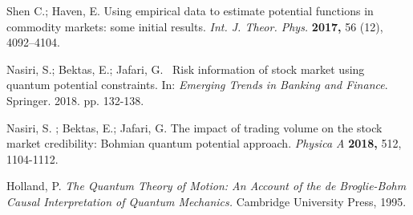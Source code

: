 \documentclass[journal,article,submit,moreauthors,pdftex]{Definitions/mdpi}
\begin{document}
\begin{thebibliography}{99}
	 Shen C.; Haven, E. Using empirical data to estimate potential
	functions in commodity markets: some initial results. \textit{Int. J. Theor.
		Phys. } \textbf{2017, }56 (12), 4092--4104.
	
	 Nasiri, S.; Bektas, E.; Jafari, G. \ Risk information of
	stock market using quantum potential constraints. In: \textit{Emerging
		Trends in Banking and Finance}. Springer. 2018. pp. 132-138.
	
	 Nasiri, S. ; Bektas, E.; Jafari, G. The impact of trading
	volume on the stock market credibility: Bohmian quantum potential approach. 
	\textit{Physica A} \textbf{2018, }512, 1104-1112.
	
	 Holland, P. \textit{The Quantum Theory of Motion: An
		Account of the de Broglie-Bohm Causal Interpretation of Quantum Mechanics.}
	Cambridge University Press, 1995. 
\end{thebibliography}




\end{document}
